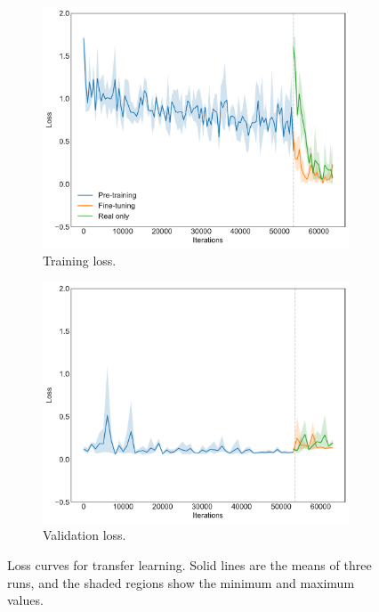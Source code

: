 \begin{figure}[h]
    \centering
    \begin{subfigure}{0.45\textwidth}
        \centering
        \includegraphics[width=\linewidth]{evaluation/figs/transfer_training_loss.pdf}
        \caption{Training loss.}
        \label{fig:classification_transfer_loss_training}
    \end{subfigure}
    \begin{subfigure}{0.45\textwidth}
        \centering
        \includegraphics[width=\linewidth]{evaluation/figs/transfer_validation_loss.pdf}
        \caption{Validation loss.}
        \label{fig:classification_transfer_loss_validation}
    \end{subfigure}
    \caption{Loss curves for transfer learning. Solid lines are the means of three runs, and the shaded regions show the minimum and maximum values.}
    \label{fig:classification_transfer_loss}
\end{figure}

